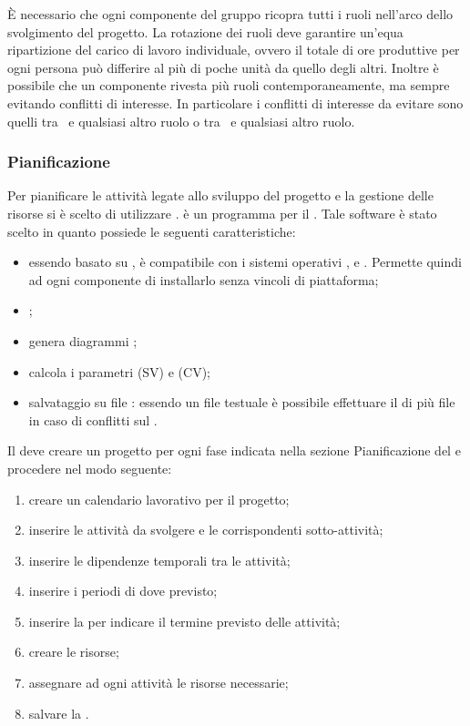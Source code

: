 \documentclass[12pt,a4paper]{article}
\begin{document}
È necessario che ogni componente del gruppo ricopra tutti i ruoli nell'arco dello svolgimento del progetto. La rotazione dei ruoli deve garantire un'equa ripartizione del carico di lavoro individuale, ovvero il totale di ore produttive per ogni persona può differire al più di poche unità da quello degli altri. Inoltre è possibile che un componente rivesta più ruoli contemporaneamente, ma sempre evitando conflitti di interesse. In particolare i conflitti di interesse da evitare sono quelli tra \PM\ e qualsiasi altro ruolo o tra \VR\ e qualsiasi altro ruolo.

\subsubsection{Pianificazione}
Per pianificare le attività legate allo sviluppo del progetto e la gestione delle risorse si è scelto di utilizzare .
 è un programma \textit{} per il \textit{}. Tale software è stato scelto in quanto possiede le seguenti caratteristiche:
\begin{itemize}
	\item  essendo basato su , è compatibile con i sistemi operativi , e . Permette quindi ad ogni componente di installarlo senza vincoli di piattaforma; 
	\item {};
	\item genera diagrammi ;
	\item calcola i parametri \textit{} (SV) e \textit{} (CV);
	\item salvataggio su file : essendo un file testuale è possibile effettuare il  di più file in caso di conflitti sul .
\end{itemize}

Il \PM deve creare un progetto per ogni fase indicata nella sezione Pianificazione del \PdP{} e procedere nel modo seguente:
\begin{enumerate}
	\item creare un calendario lavorativo per il progetto;
	\item inserire le attività da svolgere e le corrispondenti sotto-attività;
	\item inserire le dipendenze temporali tra le attività;
	\item inserire i periodi di \textit{} dove previsto;
	\item inserire la \textit{} per indicare il termine previsto delle attività;
	\item creare le risorse;
	\item assegnare ad ogni attività le risorse necessarie;
	\item salvare la \textit{}.
\end{enumerate}
\end{document}
